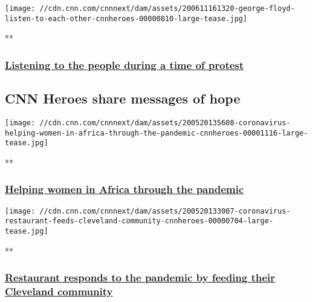 \href{/videos/tv/2020/06/11/george-floyd-listen-to-each-other-cnnheroes.cnn}{}

\texttt{[image: //cdn.cnn.com/cnnnext/dam/assets/200611161320-george-floyd-listen-to-each-other-cnnheroes-00000810-large-tease.jpg]}

**

\hypertarget{listening-to-the-people-during-a-time-of-protest}{%
\subsubsection{\texorpdfstring{\href{/videos/tv/2020/06/11/george-floyd-listen-to-each-other-cnnheroes.cnn}{Listening
to the people during a time of
protest}}{Listening to the people during a time of protest}}\label{listening-to-the-people-during-a-time-of-protest}}

\hypertarget{cnn-heroes-share-messages-of-hope}{%
\subsection{CNN Heroes share messages of
hope}\label{cnn-heroes-share-messages-of-hope}}

\href{/videos/tv/2020/05/20/coronavirus-helping-women-in-africa-through-the-pandemic-cnnheroes.cnn}{}

\texttt{[image: //cdn.cnn.com/cnnnext/dam/assets/200520135608-coronavirus-helping-women-in-africa-through-the-pandemic-cnnheroes-00001116-large-tease.jpg]}

**

\hypertarget{helping-women-in-africa-through-the-pandemic}{%
\subsubsection{\texorpdfstring{\href{/videos/tv/2020/05/20/coronavirus-helping-women-in-africa-through-the-pandemic-cnnheroes.cnn}{Helping
women in Africa through the
pandemic}}{Helping women in Africa through the pandemic}}\label{helping-women-in-africa-through-the-pandemic}}

\href{/videos/tv/2020/05/20/coronavirus-restaurant-feeds-cleveland-community-cnnheroes.cnn}{}

\texttt{[image: //cdn.cnn.com/cnnnext/dam/assets/200520133007-coronavirus-restaurant-feeds-cleveland-community-cnnheroes-00000704-large-tease.jpg]}

**

\hypertarget{restaurant-responds-to-the-pandemic-by-feeding-their-cleveland-community}{%
\subsubsection{\texorpdfstring{\href{/videos/tv/2020/05/20/coronavirus-restaurant-feeds-cleveland-community-cnnheroes.cnn}{Restaurant
responds to the pandemic by feeding their Cleveland
community}}{Restaurant responds to the pandemic by feeding their Cleveland community}}\label{restaurant-responds-to-the-pandemic-by-feeding-their-cleveland-community}}

